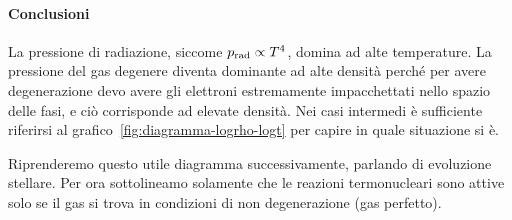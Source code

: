 \paragraph{Conclusioni}
La pressione di radiazione, siccome $p_\textup{rad} \propto T^4$, domina ad alte temperature. La pressione del gas degenere diventa dominante ad alte densità perché per avere degenerazione devo avere gli elettroni estremamente impacchettati nello spazio delle fasi, e ciò corrisponde ad elevate densità. Nei casi intermedi è sufficiente riferirsi al grafico~\ref{fig:diagramma-logrho-logt} per capire in quale situazione si è.

Riprenderemo questo utile diagramma successivamente, parlando di evoluzione stellare. Per ora sottolineamo solamente che le reazioni termonucleari sono attive solo se il gas si trova in condizioni di non degenerazione (gas perfetto).